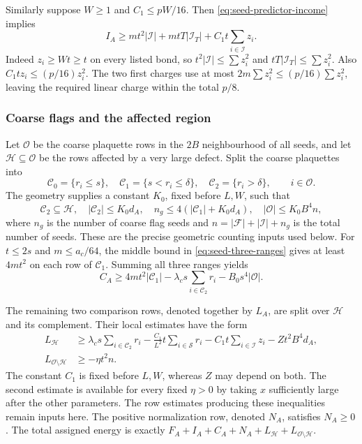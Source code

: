 Similarly suppose $W\ge1$ and $C_1\le pW/16$. Then
\eqref{eq:seed-predictor-income} implies
\begin{equation}\label{eq:seed-predictor-reserve}
 I_A\ge mt^2|\mathcal I|+mtT|\mathcal I_T|
                         +C_1t\sum_{i\in\mathcal I}z_i.
\end{equation}
Indeed $z_i\ge Wt\ge t$ on every listed bond, so
$t^2|\mathcal I|\le\sum z_i^2$ and
$tT|\mathcal I_T|\le\sum z_i^2$. Also
$C_1t z_i\le(p/16)z_i^2$. The two first charges use at most
$2m\sum z_i^2\le(p/16)\sum z_i^2$, leaving the required linear
charge within the total $p/8$.

\subsubsection{Coarse flags and the affected region}
Let $\mathcal O$ be the coarse plaquette rows in the $2B$ neighbourhood
of all seeds, and let $\mathcal H\subseteq\mathcal O$ be the rows
affected by a very large defect. Split the coarse plaquettes into
\[
 \mathcal C_0=\{r_i\le s\},\quad
 \mathcal C_1=\{s<r_i\le\delta\},\quad
 \mathcal C_2=\{r_i>\delta\},
 \qquad i\in\mathcal O.
\]
The geometry supplies a constant $K_0$, fixed before $L,W$, such that
\begin{equation}\label{eq:seed-geometric-counts}
 \mathcal C_2\subseteq\mathcal H,\quad
 |\mathcal C_2|\le K_0d_A,\quad
 n_g\le4(|\mathcal C_1|+K_0d_A),\quad
 |\mathcal O|\le K_0B^4 n,
\end{equation}
where $n_g$ is the number of coarse flag seeds and
$n=|\mathcal F|+|\mathcal I|+n_g$ is the total number of seeds.
These are the precise geometric counting inputs used below.
For $t\le2s$ and $m\le a_c/64$, the middle bound in
\eqref{eq:seed-three-ranges} gives at least $4mt^2$ on each row of
$\mathcal C_1$. Summing all three ranges yields
\begin{equation}\label{eq:seed-coarse-reserve}
 C_A\ge4mt^2|\mathcal C_1|
       -\lambda_c s\sum_{i\in\mathcal C_2}r_i
       -B_0s^4|\mathcal O|.
\end{equation}

The remaining two comparison rows, denoted together by $L_A$, are
split over $\mathcal H$ and its complement. Their local estimates
have the form
\begin{align}
 L_{\mathcal H}&\ge\lambda_c s\sum_{i\in\mathcal C_2}r_i
 -\frac{C_1}{L^2}t\sum_{i\in\mathcal S}r_i
 -C_1t\sum_{i\in\mathcal I}z_i-Zt^2B^4d_A,
 \label{eq:seed-hit-input}\\
 L_{\mathcal O\setminus\mathcal H}&\ge-\eta t^2 n.
 \label{eq:seed-unhit-input}
\end{align}
The constant $C_1$ is fixed before $L,W$, whereas $Z$ may depend on
both. The second estimate is available for every fixed $\eta>0$ by
taking $x$ sufficiently large after the other parameters. The row
estimates producing these inequalities remain inputs here. The
positive normalization row, denoted $N_A$, satisfies $N_A\ge0$.
The total assigned energy is exactly
$F_A+I_A+C_A+N_A+L_{\mathcal H}+L_{\mathcal O\setminus\mathcal H}$.

